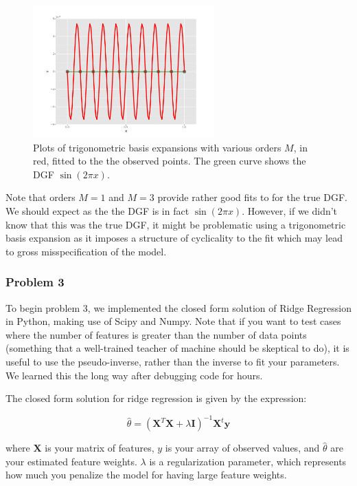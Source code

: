 \documentclass[10pt]{article}
\begin{document}
\begin{figure}[ht]
\begin{minipage}[b]{.24\linewidth}
		\caption*{$M=3$}
	\end{minipage}
	\begin{minipage}[b]{.24\linewidth}
		\includegraphics[width=1\linewidth, height=2in]{Meq9T.png}
		\caption*{$M=9$}
	\end{minipage}
	\caption{Plots of trigonometric basis expansions with various orders $M$, in red, fitted to the the observed points. The green curve shows the DGF $\sin(2\pi x)$.}
\end{figure}

Note that orders $M=1$ and $M=3$ provide rather good fits to for the true DGF. We should expect as the the DGF is in fact $\sin(2\pi x)$. However, if we didn't know that this was the true DGF, it might be problematic using a trigonometric basis expansion as it imposes a structure of cyclicality to the fit which may lead to gross misspecification of the model.

\subsubsection*{Problem 3}

To begin problem 3, we implemented the closed form solution of Ridge Regression in Python, making use of Scipy and Numpy. Note that if you want to test cases where the number of features is greater than the number of data points (something that a well-trained teacher of machine should be skeptical to do), it is useful to use the pseudo-inverse, rather than the inverse to fit your parameters. We learned this the long way after debugging code for hours.

The closed form solution for ridge regression is given by the expression:

\begin{equation}
\hat{\theta} = (\mathbf{X}^T\mathbf{X} + \lambda \mathbf{I})^{-1}\mathbf{X}^t\mathbf{y}
\end{equation}

\noindent where $\mathbf{X}$ is your matrix of features, $y$ is your array of observed values, and $\hat{\theta}$ are your estimated feature weights. $\lambda$ is a regularization parameter, which represents how much you penalize the model for having large feature weights.
\end{document}
